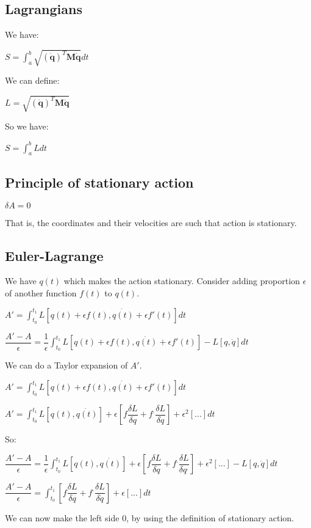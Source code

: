 
\subsection{Lagrangians}

We have:

\(S = \int_a^b \sqrt {(\mathbf {\dot q})^T\mathbf M\mathbf {\dot q}}dt\)

We can define:

\(L=\sqrt {(\mathbf {\dot q})^T\mathbf M\mathbf {\dot q}}\)

So we have:

\(S=\int_a^b L dt\)

\subsection{Principle of stationary action}

\(\delta A=0\)

That is, the coordinates and their velocities are such that action is stationary.

\subsection{Euler-Lagrange}

We have \(q(t)\) which makes the action stationary. Consider adding proportion \(\epsilon \) of another function \(f(t)\) to \(q(t)\).

\(A'=\int_{t_0}^{t_1} L[q(t)+\epsilon f(t), \dot {q(t)}+\epsilon f'(t)]dt\)

\(\dfrac{A'-A}{\epsilon }=\dfrac{1}{\epsilon}\int_{t_0}^{t_1} L[q(t)+\epsilon f(t), \dot {q(t)}+\epsilon f'(t)]-L[q,\dot q]dt\)

We can do a Taylor expansion of \(A'\).

\(A'=\int_{t_0}^{t_1} L[q(t)+\epsilon f(t), \dot {q(t)}+\epsilon f'(t)]dt\)

\(A'=\int_{t_0}^{t_1} L[q(t),\dot {q(t)}]+\epsilon [f\dfrac{\delta L}{\delta q}+f^.\dfrac{\delta L}{\delta \dot q}]+\epsilon^2 [...]dt\)

So:

\(\dfrac{A'-A}{\epsilon }=\dfrac{1}{\epsilon}\int_{t_0}^{t_1}L[q(t),\dot {q(t)}]+\epsilon [f\dfrac{\delta L}{\delta q}+f^.\dfrac{\delta L}{\delta q^.}]+\epsilon^2 [...]-L[q,\dot q]dt\)

\(\dfrac{A'-A}{\epsilon }=\int_{t_0}^{t_1}[f\dfrac{\delta L}{\delta q}+f^.\dfrac{\delta L}{\delta \dot {q}}]+\epsilon [...]dt\)

We can now make the left side \(0\), by using the definition of stationary action.

